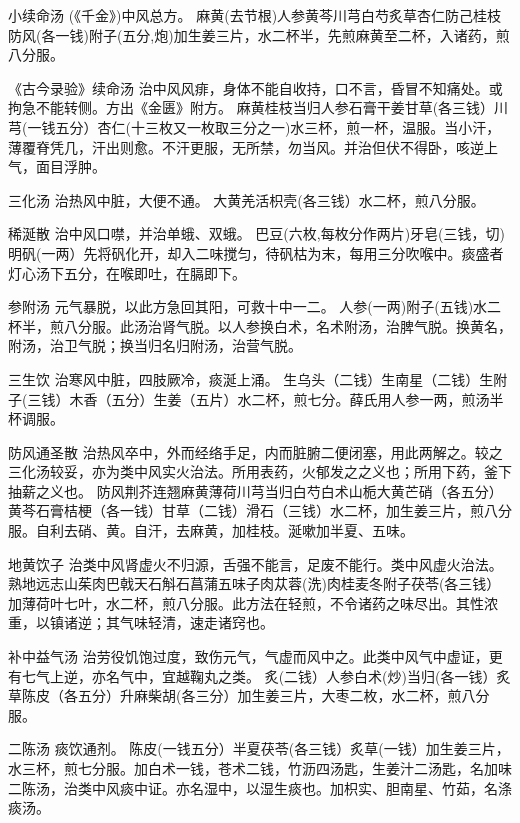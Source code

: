 \documentclass[a4paper,12pt,UTF8,twoside]{ctexbook}
\begin{document}
    
    小续命汤
    (《千金》)中风总方。
    麻黄(去节根)人参黄芩川芎白芍炙草杏仁防己桂枝防风(各一钱)附子(五分,炮)加生姜三片，水二杯半，先煎麻黄至二杯，入诸药，煎八分服。
    
    《古今录验》续命汤
    治中风风痱，身体不能自收持，口不言，昏冒不知痛处。或拘急不能转侧。方出《金匮》附方。
    麻黄桂枝当归人参石膏干姜甘草(各三钱）川芎(一钱五分）杏仁(十三枚又一枚取三分之一)水三杯，煎一杯，温服。当小汗，薄覆脊凭几，汗出则愈。不汗更服，无所禁，勿当风。并治但伏不得卧，咳逆上气，面目浮肿。
    
    三化汤
    治热风中脏，大便不通。
    大黄羌活枳壳(各三钱）水二杯，煎八分服。
    
    稀涎散
    治中风口噤，并治单蛾、双蛾。
    巴豆(六枚,每枚分作两片)牙皂(三钱，切)明矾(一两）先将矾化开，却入二味搅匀，待矾枯为末，每用三分吹喉中。痰盛者灯心汤下五分，在喉即吐，在膈即下。
    
    参附汤
    元气暴脱，以此方急回其阳，可救十中一二。
    人参(一两)附子(五钱)水二杯半，煎八分服。此汤治肾气脱。以人参换白术，名术附汤，治脾气脱。换黄名，附汤，治卫气脱；换当归名归附汤，治营气脱。
    
    三生饮
    治寒风中脏，四肢厥冷，痰涎上涌。
    生乌头（二钱）生南星（二钱）生附子(三钱）木香（五分）生姜（五片）水二杯，煎七分。薛氏用人参一两，煎汤半杯调服。
    
    防风通圣散
    治热风卒中，外而经络手足，内而脏腑二便闭塞，用此两解之。较之三化汤较妥，亦为类中风实火治法。所用表药，火郁发之之义也；所用下药，釜下抽薪之义也。
    防风荆芥连翘麻黄薄荷川芎当归白芍白术山栀大黄芒硝（各五分）黄芩石膏桔梗（各一钱）甘草（二钱）滑石（三钱）水二杯，加生姜三片，煎八分服。自利去硝、黄。自汗，去麻黄，加桂枝。涎嗽加半夏、五味。
    
    地黄饮子
    治类中风肾虚火不归源，舌强不能言，足废不能行。类中风虚火治法。
    熟地远志山茱肉巴戟天石斛石菖蒲五味子肉苁蓉(洗)肉桂麦冬附子茯苓(各三钱）加薄荷叶七叶，水二杯，煎八分服。此方法在轻煎，不令诸药之味尽出。其性浓重，以镇诸逆；其气味轻清，速走诸窍也。
    
    补中益气汤
    治劳役饥饱过度，致伤元气，气虚而风中之。此类中风气中虚证，更有七气上逆，亦名气中，宜越鞠丸之类。
    炙(二钱）人参白术(炒)当归(各一钱）炙草陈皮（各五分）升麻柴胡(各三分）加生姜三片，大枣二枚，水二杯，煎八分服。
    
    二陈汤
    痰饮通剂。
    陈皮(一钱五分）半夏茯苓(各三钱）炙草(一钱）加生姜三片，水三杯，煎七分服。加白术一钱，苍术二钱，竹沥四汤匙，生姜汁二汤匙，名加味二陈汤，治类中风痰中证。亦名湿中，以湿生痰也。加枳实、胆南星、竹茹，名涤痰汤。
    
\end{document}
